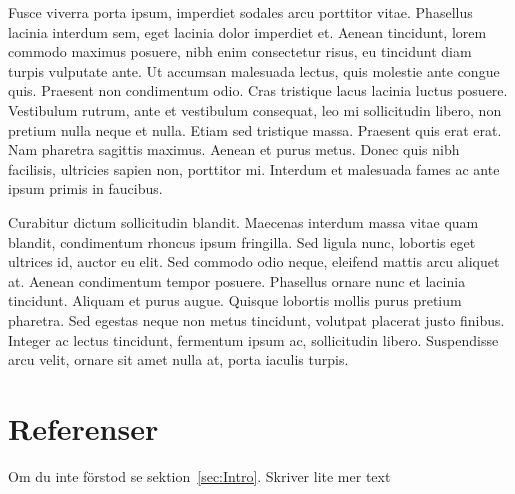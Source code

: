 \documentclass[a4paper,10pt]{article}
\begin{document}
Fusce viverra porta ipsum, imperdiet sodales arcu porttitor vitae. Phasellus lacinia interdum sem, eget lacinia dolor imperdiet et. Aenean tincidunt, lorem commodo maximus posuere, nibh enim consectetur risus, eu tincidunt diam turpis vulputate ante. Ut accumsan malesuada lectus, quis molestie ante congue quis. Praesent non condimentum odio. Cras tristique lacus lacinia luctus posuere. Vestibulum rutrum, ante et vestibulum consequat, leo mi sollicitudin libero, non pretium nulla neque et nulla. Etiam sed tristique massa. Praesent quis erat erat. Nam pharetra sagittis maximus. Aenean et purus metus. Donec quis nibh facilisis, ultricies sapien non, porttitor mi. Interdum et malesuada fames ac ante ipsum primis in faucibus.

Curabitur dictum sollicitudin blandit. Maecenas interdum massa vitae quam blandit, condimentum rhoncus ipsum fringilla. Sed ligula nunc, lobortis eget ultrices id, auctor eu elit. Sed commodo odio neque, eleifend mattis arcu aliquet at. Aenean condimentum tempor posuere. Phasellus ornare nunc et lacinia tincidunt. Aliquam et purus augue. Quisque lobortis mollis purus pretium pharetra. Sed egestas neque non metus tincidunt, volutpat placerat justo finibus. Integer ac lectus tincidunt, fermentum ipsum ac, sollicitudin libero. Suspendisse arcu velit, ornare sit amet nulla at, porta iaculis turpis.

\section{Referenser}
Om du inte förstod se sektion~\ref{sec:Intro}.
Skriver lite mer text
\end{document}
